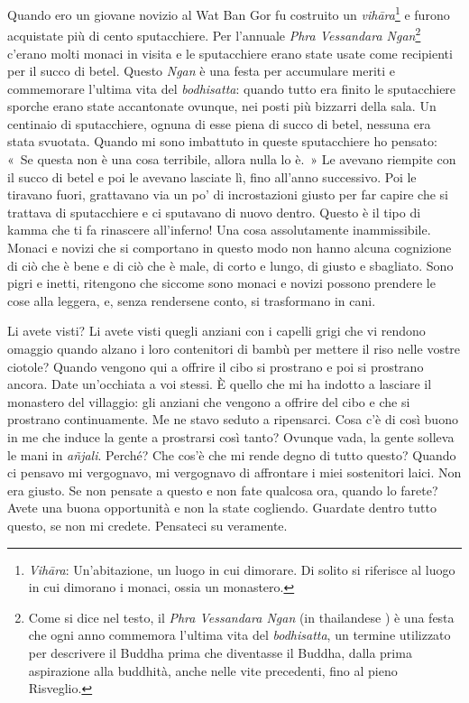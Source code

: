 Quando ero un giovane novizio al Wat Ban Gor fu costruito un
\emph{vihāra}\footnote{\emph{Vihāra}: Un'abitazione, un luogo in cui
  dimorare. Di solito si riferisce al luogo in cui dimorano i monaci,
  ossia un monastero.} e furono acquistate più di cento sputacchiere.
Per l'annuale \emph{Phra Vessandara Ngan}\footnote{Come si dice nel
  testo, il \emph{Phra Vessandara Ngan} (in thailandese ) è
  una festa che ogni anno commemora l'ultima vita del \emph{bodhisatta},
  un termine utilizzato per descrivere il Buddha prima che diventasse il
  Buddha, dalla prima aspirazione alla buddhità, anche nelle vite
  precedenti, fino al pieno Risveglio.} c'erano molti monaci in visita e
le sputacchiere erano state usate come recipienti per il succo di betel.
Questo \emph{Ngan} è una festa per accumulare meriti e commemorare
l'ultima vita del \emph{bodhisatta}: quando tutto era finito le
sputacchiere sporche erano state accantonate ovunque, nei posti più
bizzarri della sala. Un centinaio di sputacchiere, ognuna di esse piena
di succo di betel, nessuna era stata svuotata. Quando mi sono imbattuto
in queste sputacchiere ho pensato: «~Se questa non è una cosa terribile,
allora nulla lo è.~» Le avevano riempite con il succo di betel e poi le
avevano lasciate lì, fino all'anno successivo. Poi le tiravano fuori,
grattavano via un po' di incrostazioni giusto per far capire che si
trattava di sputacchiere e ci sputavano di nuovo dentro. Questo è il
tipo di kamma che ti fa rinascere all'inferno! Una cosa
assolutamente inammissibile. Monaci e novizi che si comportano in questo
modo non hanno alcuna cognizione di ciò che è bene e di ciò che è male,
di corto e lungo, di giusto e sbagliato. Sono pigri e inetti, ritengono
che siccome sono monaci e novizi possono prendere le cose alla leggera,
e, senza rendersene conto, si trasformano in cani.

Li avete visti? Li avete visti quegli anziani con i capelli grigi che vi
rendono omaggio quando alzano i loro contenitori di bambù per mettere il
riso nelle vostre ciotole? Quando vengono qui a offrire il cibo si
prostrano e poi si prostrano ancora. Date un'occhiata a voi stessi. È
quello che mi ha indotto a lasciare il monastero del villaggio: gli
anziani che vengono a offrire del cibo e che si prostrano continuamente.
Me ne stavo seduto a ripensarci. Cosa c'è di così buono in me che induce
la gente a prostrarsi così tanto? Ovunque vada, la gente solleva le mani
in \emph{añjali}. Perché? Che cos'è che mi rende degno di tutto questo?
Quando ci pensavo mi vergognavo, mi vergognavo di affrontare i miei
sostenitori laici. Non era giusto. Se non pensate a questo e non fate
qualcosa ora, quando lo farete? Avete una buona opportunità e non la
state cogliendo. Guardate dentro tutto questo, se non mi credete.
Pensateci su veramente.

